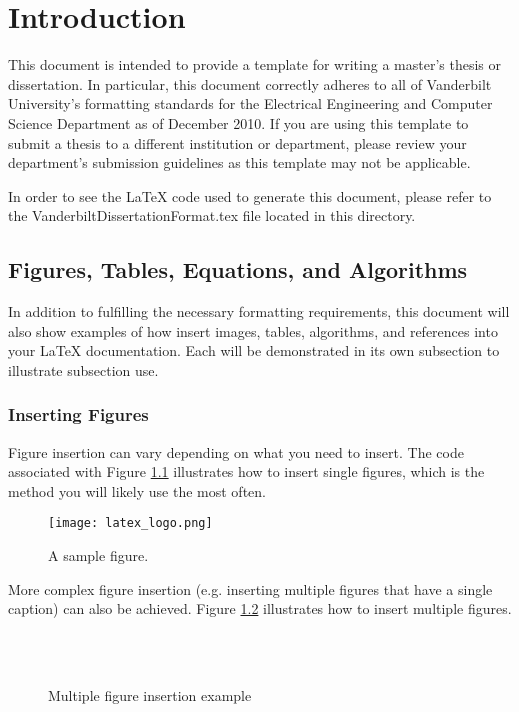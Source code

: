 \chapter{Introduction}
	This document is intended to provide a template for writing a master's thesis or dissertation. In particular, this document correctly adheres to all of Vanderbilt University's formatting standards for the Electrical Engineering and Computer Science Department as of December 2010. If you are using this template to submit a thesis to a different institution or department, please review your department's submission guidelines as this template may not be applicable.
	
	In order to see the LaTeX code used to generate this document, please refer to the VanderbiltDissertationFormat.tex file located in this directory. 
	
\section{Figures, Tables, Equations, and Algorithms}
	In addition to fulfilling the necessary formatting requirements, this document will also show examples of how insert images, tables, algorithms, and references into your LaTeX documentation. Each will be demonstrated in its own subsection to illustrate subsection use.

\subsection{Inserting Figures}
Figure insertion can vary depending on what you need to insert. The code associated with Figure \ref{fig:texlogo} illustrates how to insert single figures, which is the method you will likely use the most often. 

\begin{figure}
\centering
\texttt{[image: latex\_logo.png]}
\caption{A sample figure.}
\label{fig:texlogo}
\end{figure}

More complex figure insertion (e.g. inserting multiple figures that have a single caption) can also be achieved. Figure \ref{fig:testedShapes} illustrates how to insert multiple figures.

\begin{figure}[htp]
  \begin{center}
    \\
    \\
 \end{center}
  \caption{Multiple figure insertion example}
  \label{fig:testedShapes}
\end{figure}


